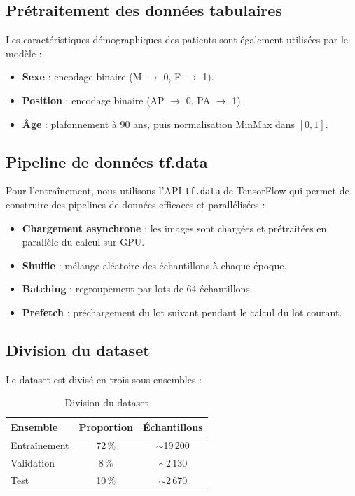 \documentclass[12pt,a4paper,twoside]{report}
\begin{document}
\subsection{Prétraitement des données tabulaires}

Les caractéristiques démographiques des patients sont également utilisées par le modèle :

\begin{itemize}
  \item \textbf{Sexe} : encodage binaire (M $\rightarrow$ 0, F $\rightarrow$ 1).
  \item \textbf{Position} : encodage binaire (AP $\rightarrow$ 0, PA $\rightarrow$ 1).
  \item \textbf{Âge} : plafonnement à 90 ans, puis normalisation MinMax dans $[0, 1]$.
\end{itemize}

\subsection{Pipeline de données tf.data}

Pour l'entraînement, nous utilisons l'API \texttt{tf.data} de TensorFlow qui permet de construire des pipelines de données efficaces et parallélisées :

\begin{itemize}
  \item \textbf{Chargement asynchrone} : les images sont chargées et prétraitées en parallèle du calcul sur GPU.
  \item \textbf{Shuffle} : mélange aléatoire des échantillons à chaque époque.
  \item \textbf{Batching} : regroupement par lots de 64 échantillons.
  \item \textbf{Prefetch} : préchargement du lot suivant pendant le calcul du lot courant.
\end{itemize}

\subsection{Division du dataset}

Le dataset est divisé en trois sous-ensembles :

\begin{table}[H]
\centering
\begin{tabular}{lcc}
\toprule
\textbf{Ensemble} & \textbf{Proportion} & \textbf{Échantillons} \\
\midrule
Entraînement & 72\,\% & $\sim$19\,200 \\
Validation & 8\,\% & $\sim$2\,130 \\
Test & 10\,\% & $\sim$2\,670 \\
\bottomrule
\end{tabular}
\caption{Division du dataset}
\end{table}
\end{document}

